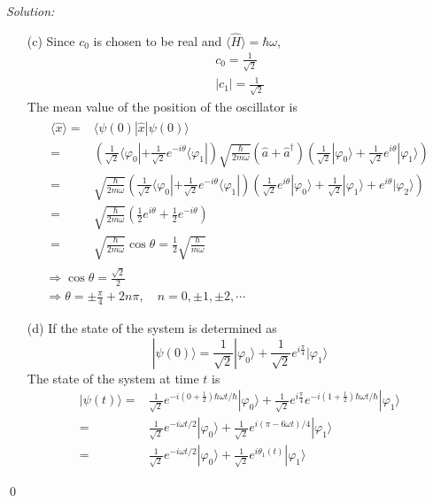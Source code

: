 \documentclass[12pt,a4paper]{article}
\newenvironment{sol}
    {\emph{Solution:}
    }
    {
    \qed
    }
\begin{document}
\begin{sol}
\begin{itemize}
\item[(c)] Since $c_0$ is chosen to be real and $\langle\hat{H}\rangle=\hbar\omega$,
\begin{gather}
c_0=\frac{1}{\sqrt{2}}\\
|c_1|=\frac{1}{\sqrt{2}}
\end{gather}
The mean value of the position of the oscillator is
\begin{gather}
\begin{align}
\nonumber\langle\hat{x}\rangle=&\langle\psi(0)|\hat{x}|\psi(0)\rangle\\
\nonumber=&(\frac{1}{\sqrt{2}}\langle\varphi_0|+\frac{1}{\sqrt{2}}e^{-i\theta}\langle\varphi_1|)\sqrt{\frac{\hbar}{2m\omega}}(\hat{a}+\hat{a}^{\dagger})(\frac{1}{\sqrt{2}}|\varphi_0\rangle+\frac{1}{\sqrt{2}}e^{i\theta}|\varphi_1\rangle)\\
\nonumber=&\sqrt{\frac{\hbar}{2m\omega}}(\frac{1}{\sqrt{2}}\langle\varphi_0|+\frac{1}{\sqrt{2}}e^{-i\theta}\langle\varphi_1|)(\frac{1}{\sqrt{2}}e^{i\theta}|\varphi_0\rangle+\frac{1}{\sqrt{2}}|\varphi_1\rangle+e^{i\theta}|\varphi_2\rangle)\\
\nonumber=&\sqrt{\frac{\hbar}{2m\omega}}(\frac{1}{2}e^{i\theta}+\frac{1}{2}e^{-i\theta})\\
=&\sqrt{\frac{\hbar}{2m\omega}}\cos\theta=\frac{1}{2}\sqrt{\frac{\hbar}{m\omega}}
\end{align}\\
\Longrightarrow\cos\theta=\frac{\sqrt{2}}{2}\\
\Longrightarrow\theta=\pm\frac{\pi}{4}+2n\pi,\quad n=0,\pm1,\pm2,\cdots
\end{gather}
\item[(d)] If the state of the system is determined as
\begin{equation}
|\psi(0)\rangle=\frac{1}{\sqrt{2}}|\varphi_0\rangle+\frac{1}{\sqrt{2}}e^{i\frac{\pi}{4}}|\varphi_1\rangle
\end{equation}
The state of the system at time $t$ is
\begin{align}
\nonumber|\psi(t)\rangle=&\frac{1}{\sqrt{2}}e^{-i(0+\frac{1}{2})\hbar\omega t/\hbar}|\varphi_0\rangle+\frac{1}{\sqrt{2}}e^{i\frac{\pi}{4}}e^{-i(1+\frac{1}{2})\hbar\omega t/\hbar}|\varphi_1\rangle\\
\nonumber=&\frac{1}{\sqrt{2}}e^{-i\omega t/2}|\varphi_0\rangle+\frac{1}{\sqrt{2}}e^{i(\pi-6\omega t)/4}|\varphi_1\rangle\\
=&\frac{1}{\sqrt{2}}e^{-i\omega t/2}|\varphi_0\rangle+\frac{1}{\sqrt{2}}e^{i\theta_1(t)}|\varphi_1\rangle
\end{align}

\end{itemize}
\end{sol}
\end{document}
